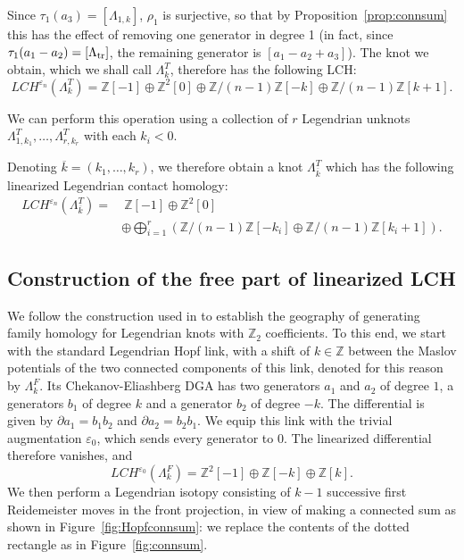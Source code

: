 \documentclass[11pt]{amsart}
\theoremstyle{plain}
\theoremstyle{remark}
\numberwithin{equation}{section}
\newcommand{\Z}{\ensuremath{\mathbb{Z}}}
\begin{document}
Since $\tau_1(a_3) = [\Lambda_{1,k}]$, $\rho_1$ is 
surjective, so that by Proposition~\ref{prop:connsum} this has the effect of removing one generator in degree 1 (in fact, since $\tau_1(a_1-a_2) =  [\Lambda_{\rm tr}]$, 
the remaining generator is $[a_1 - a_2 + a_3]$). The knot we obtain, which we shall call $\Lambda^T_k$, 
therefore has the following LCH:
$$
LCH^{\varepsilon_n}(\Lambda^T_k) = \Z[-1] \oplus \Z^2[0] \oplus \Z/(n-1)\Z[-k] \oplus \Z/(n-1)\Z[k+1].
$$

We can perform this operation using a collection of $r$ Legendrian unknots $\Lambda^T_{1,k_1}, \ldots, \Lambda^T_{r, k_r}$
with each $k_i < 0$. 

Denoting $\overline{k} = (k_1, \ldots, k_r)$, we therefore obtain a knot $\Lambda^T_{\overline{k}}$ which has the following 
linearized Legendrian contact homology:
\begin{align*}
LCH^{\varepsilon_n}(\Lambda^T_{\overline{k}}) = & \ \Z[-1] \oplus \Z^2[0] \\
& \oplus \bigoplus_{i=1}^r ( \Z/(n-1)\Z[-k_i] \oplus \Z/(n-1)\Z[k_i+1]).
\end{align*}


\subsection{Construction of the free part of linearized LCH}
\label{sec:freelinLCH}
We follow the construction used in \cite[Lemma~6.10]{BST} to establish the geography of generating family homology for Legendrian knots
with $\Z_2$ coefficients. To this end, we start with the standard Legendrian Hopf link, with a shift of $k \in \Z$ between the Maslov 
potentials of the two connected components of this link, denoted for this reason by $\Lambda^F_k$. Its Chekanov-Eliashberg DGA has 
two generators $a_1$ and $a_2$ of degree $1$, a generators $b_1$ of degree $k$ and a generator $b_2$ of degree $-k$. 
The differential is given by $\partial a_1 = b_1 b_2$ and $\partial a_2 = b_2 b_1$. We equip this link with the trivial augmentation
$\varepsilon_0$, which sends every generator to $0$. The linearized differential therefore vanishes, and 
$$
LCH^{\varepsilon_0}(\Lambda^F_k) = \Z^2[-1] \oplus \Z[-k] \oplus \Z[k].
$$
We then perform a Legendrian isotopy consisting of $k-1$ successive first Reidemeister moves in the front projection, in view of 
making a connected sum as shown in Figure~\ref{fig:Hopfconnsum}: we replace the contents of the dotted rectangle as in 
Figure~\ref{fig:connsum}.
\end{document}
